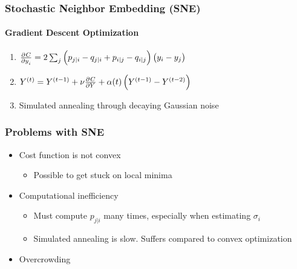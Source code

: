 \documentclass{beamer}
\begin{document}
\begin{frame}
  \frametitle{Stochastic Neighbor Embedding (SNE)}
  \framesubtitle{Gradient Descent Optimization}

  \begin{enumerate}
  \item $\pd{C}{y_i} = 2 \sum_j \del{p_{j|i} - q_{j|i} + p_{i|j} - q_{i|j}} \del{y_i - y_j}$

  \item $Y^{(t)} = Y^{(t - 1)} + \nu \pd{C}{Y} + \alpha(t) \del{Y^{(t - 1)} - Y^{(t - 2)}}$

    \item Simulated annealing through decaying Gaussian noise
  \end{enumerate}
\end{frame}

\begin{frame}
  \frametitle{Problems with SNE}

  \begin{itemize}
  \item Cost function is not convex
    \begin{itemize}
    \item Possible to get stuck on local minima
    \end{itemize}

  \item Computational inefficiency
    \begin{itemize}
    \item Must compute $p_{j|i}$ many times, especially when estimating $\sigma_i$

    \item Simulated annealing is slow. Suffers compared to convex optimization
    \end{itemize}

  \item Overcrowding
  \end{itemize}
\end{frame}
\end{document}
